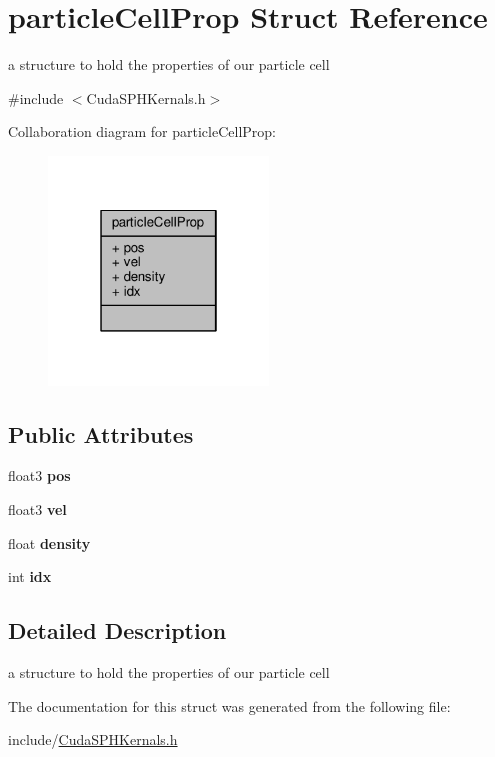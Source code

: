 \hypertarget{structparticle_cell_prop}{\section{particle\-Cell\-Prop Struct Reference}
\label{structparticle_cell_prop}
}


a structure to hold the properties of our particle cell  




{\ttfamily \#include $<$Cuda\-S\-P\-H\-Kernals.\-h$>$}



Collaboration diagram for particle\-Cell\-Prop\-:\nopagebreak
\begin{figure}[H]
\begin{center}
\leavevmode
\includegraphics[width=166pt]{structparticle_cell_prop__coll__graph}
\end{center}
\end{figure}
\subsection*{Public Attributes}
\begin{DoxyCompactItemize}
\item 
\hypertarget{structparticle_cell_prop_a016a16c8e3e05c845ff225c15737cf2e}{float3 {\bfseries pos}}\label{structparticle_cell_prop_a016a16c8e3e05c845ff225c15737cf2e}

\item 
\hypertarget{structparticle_cell_prop_a2a2e5a1e900a4ef5635a7967c0049df3}{float3 {\bfseries vel}}\label{structparticle_cell_prop_a2a2e5a1e900a4ef5635a7967c0049df3}

\item 
\hypertarget{structparticle_cell_prop_a27ad7b6527abe273b0e4eb1d91e9b71c}{float {\bfseries density}}\label{structparticle_cell_prop_a27ad7b6527abe273b0e4eb1d91e9b71c}

\item 
\hypertarget{structparticle_cell_prop_ac32e55524eadd3499ccb99c0d04ef557}{int {\bfseries idx}}\label{structparticle_cell_prop_ac32e55524eadd3499ccb99c0d04ef557}

\end{DoxyCompactItemize}


\subsection{Detailed Description}
a structure to hold the properties of our particle cell 

The documentation for this struct was generated from the following file\-:\begin{DoxyCompactItemize}
\item 
include/\hyperlink{_cuda_s_p_h_kernals_8h}{Cuda\-S\-P\-H\-Kernals.\-h}\end{DoxyCompactItemize}

